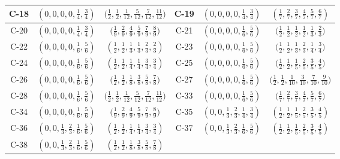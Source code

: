 \documentclass[11pt,a4paper]{amsart}
\theoremstyle{definition}
\theoremstyle{definition}
\numberwithin{equation}{section}
\begin{document}
{\begin{longtable}{|c|c|c|||c|c|c|}
\hline
C-18 &  $(0,0,0,0,\frac{1}{4},\frac{3}{4})$& $\big(\frac{1}{2},\frac{1}{2},\frac{1}{12},\frac{5}{12},\frac{7}{12},\frac{11}{12}\big)$ & 
C-19 & $\left(0,0,0,0,\frac{1}{4},\frac{3}{4}\right)$&$\left(\frac{1}{7},\frac{2}{7},\frac{3}{7},\frac{4}{7},\frac{5}{7},\frac{6}{7}\right)$\\
\hline
C-20 & $(0,0,0,0,\frac{1}{4},\frac{3}{4})$& $\big(\frac{1}{9},\frac{2}{9},\frac{4}{9},\frac{5}{9},\frac{7}{9},\frac{8}{9}\big)$ & 
C-21 & $(0,0,0,0,\frac{1}{6},\frac{5}{6})$  & $\big(\frac{1}{2},\frac{1}{2},\frac{1}{2},\frac{1}{2},\frac{1}{3},\frac{2}{3}\big)$\\
\hline
C-22 & $\left(0,0,0,0,\frac{1}{6},\frac{5}{6}\right)$ & $\left(\frac{1}{2},\frac{1}{2},\frac{1}{3},\frac{1}{3},\frac{2}{3},\frac{2}{3}\right)$ & 
C-23 & $(0,0,0,0,\frac{1}{6},\frac{5}{6})$ & $\big(\frac{1}{2},\frac{1}{2},\frac{1}{3},\frac{2}{3},\frac{1}{4},\frac{3}{4}\big)$  \\
\hline
C-24 & $\left(0,0,0,0,\frac{1}{6},\frac{5}{6}\right)$ & $\left(\frac{1}{2},\frac{1}{2},\frac{1}{4},\frac{1}{4},\frac{3}{4},\frac{3}{4}\right)$ & 
C-25 & $(0,0,0,0,\frac{1}{6},\frac{5}{6})$&  $\big(\frac{1}{2},\frac{1}{2},\frac{1}{5},\frac{2}{5},\frac{3}{5},\frac{4}{5}\big)$ \\
\hline
C-26 & $(0,0,0,0,\frac{1}{6},\frac{5}{6})$& $\big(\frac{1}{2},\frac{1}{2},\frac{1}{8},\frac{3}{8},\frac{5}{8},\frac{7}{8}\big)$   & 
C-27 & $(0,0,0,0,\frac{1}{6},\frac{5}{6})$& $\big(\frac{1}{2},\frac{1}{2},\frac{1}{10},\frac{3}{10},\frac{7}{10},\frac{9}{10}\big)$  \\
\hline
C-28 & $(0,0,0,0,\frac{1}{6},\frac{5}{6})$ & $\big(\frac{1}{2},\frac{1}{2},\frac{1}{12},\frac{5}{12},\frac{7}{12},\frac{11}{12}\big)$  & 
C-33 & $(0,0,0,0,\frac{1}{6},\frac{5}{6})$ &  $\big(\frac{1}{7},\frac{2}{7},\frac{3}{7},\frac{4}{7},\frac{5}{7},\frac{6}{7}\big)$ \\ 
\hline 
C-34 & $(0,0,0,0,\frac{1}{6},\frac{5}{6})$& $\big(\frac{1}{9},\frac{2}{9},\frac{4}{9},\frac{5}{9},\frac{7}{9},\frac{8}{9}\big)$   & 
C-35 & $(0,0,\frac{1}{3},\frac{2}{3},\frac{1}{4},\frac{3}{4})$  & $(\frac{1}{2},\frac{1}{2},\frac{1}{5},\frac{2}{5},\frac{3}{5},\frac{4}{5})$ \\
\hline
C-36 & $(0,0,\frac{1}{3},\frac{2}{3},\frac{1}{6},\frac{5}{6})$ & $(\frac{1}{2},\frac{1}{2},\frac{1}{4},\frac{1}{4},\frac{3}{4},\frac{3}{4})$  & 
C-37 & $(0,0,\frac{1}{3},\frac{2}{3},\frac{1}{6},\frac{5}{6})$  & $(\frac{1}{2},\frac{1}{2},\frac{1}{5},\frac{2}{5},\frac{3}{5},\frac{4}{5})$ \\
\hline
C-38 & $(0,0,\frac{1}{3},\frac{2}{3},\frac{1}{6},\frac{5}{6})$ & $(\frac{1}{2},\frac{1}{2},\frac{1}{8},\frac{3}{8},\frac{5}{8},\frac{7}{8})$ & 

\end{longtable}}
\end{document}
